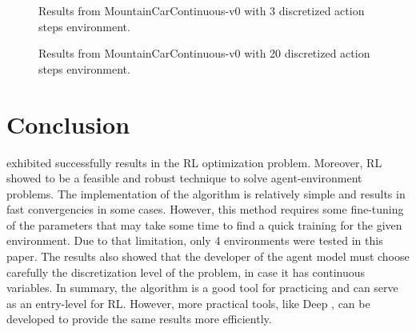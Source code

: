 \documentclass[conference]{IEEEtran}
\begin{document}
\begin{figure}[!t]
    \centering
    
    \caption{Results from MountainCarContinuous-v0 with 3 discretized action steps environment.}
    \label{results_MountainCarContinuous-v0-3}
\end{figure}

\begin{figure}[!t]
    \centering
    
    \caption{Results from MountainCarContinuous-v0 with 20 discretized action steps environment.}
    \label{results_MountainCarContinuous-v0-20}
\end{figure}


\section{Conclusion}

{\Qlearning} exhibited successfully results in the RL optimization problem.
Moreover, RL showed to be a feasible and robust technique to solve agent-environment problems.
The implementation of the algorithm is relatively simple and results in fast convergencies in some cases.
However, this method requires some fine-tuning of the parameters that may take some time to find a quick training for the given environment.
Due to that limitation, only 4 environments were tested in this paper.
The results also showed that the developer of the agent model must choose carefully the discretization level of the problem, in case it has continuous variables.
In summary, the {\Qlearning} algorithm is a good tool for practicing and can serve as an entry-level for RL.
However, more practical tools, like Deep {\QLearning}, can be developed to provide the same results more efficiently.




\end{document}

